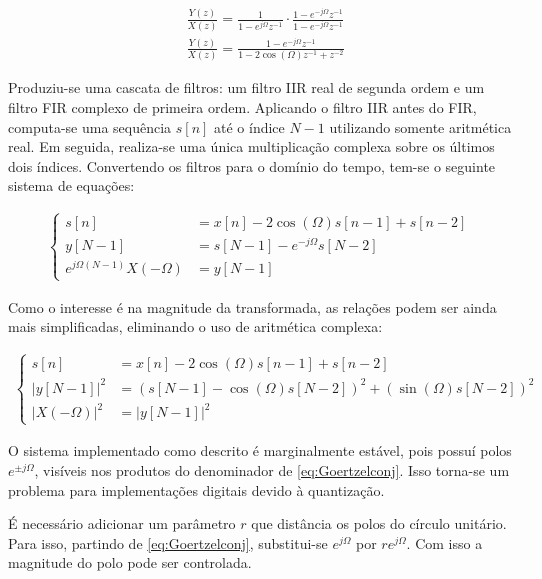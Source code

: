\begin{align}
    \label{eq:Goertzelconj}
    &\frac{Y(z)}{X(z)} = \frac{1}{1 - e^{j\Omega}z^{-1}} \cdot \frac{1 - e^{-j\Omega}z^{-1}}{1 - e^{-j\Omega}z^{-1}}\\
    &\frac{Y(z)}{X(z)} = \frac{1 - e^{-j\Omega}z^{-1}}{1 - 2\cos(\Omega)z^{-1} + z^{-2}}\nonumber
\end{align}

Produziu-se uma cascata de filtros: um filtro IIR real de segunda ordem e um filtro FIR complexo de primeira ordem. Aplicando o filtro IIR antes do FIR, computa-se uma sequência \(s[n]\) até o índice \(N-1\) utilizando somente aritmética real. Em seguida, realiza-se uma única multiplicação complexa sobre os últimos dois índices. Convertendo os filtros para o domínio do tempo, tem-se o seguinte sistema de equações:

\begin{align*}
    \begin{cases}
        s[n] &= x[n] - 2\cos(\Omega)s[n-1] + s[n-2]\\
        y[N-1] &= s[N-1] - e^{-j\Omega}s[N-2]\\
        e^{j\Omega(N-1)}X(-\Omega) &= y[N-1]
    \end{cases}
\end{align*}

Como o interesse é na magnitude da transformada, as relações podem ser ainda mais simplificadas, eliminando o uso de aritmética complexa:

\begin{align*}
    \begin{cases}
        s[n] &= x[n] - 2\cos(\Omega)s[n-1] + s[n-2]\\
        \lvert y[N-1] \rvert^2 &= (s[N-1]-\cos(\Omega)s[N-2])^2 + (\sin(\Omega)s[N-2])^{2}\\
        \lvert X(-\Omega) \rvert^2 &= \lvert y[N-1] \rvert^2
    \end{cases}
\end{align*}

O sistema implementado como descrito é marginalmente estável, pois possuí polos $e^{\pm j \Omega}$, visíveis nos produtos do denominador de \eqref{eq:Goertzelconj}. Isso torna-se um problema para implementações digitais devido à quantização. 

É necessário adicionar um parâmetro $r$ que distância os polos do círculo unitário. Para isso, partindo de \eqref{eq:Goertzelconj}, substitui-se $e^{j\Omega}$ por $re^{j\Omega}$. Com isso a magnitude do polo pode ser controlada.

